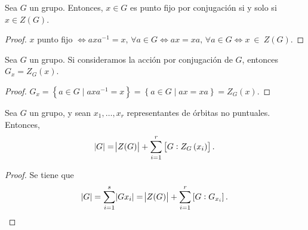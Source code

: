 \begin{prop}
    Sea $G$ un grupo. Entonces, $x \in G$ es punto fijo por conjugación si y solo si $x \in Z(G)$.
\end{prop}
\begin{proof}
    $x$ punto fijo $\iff axa^{-1} = x,\,\forall a \in G \iff ax = xa,\, \forall a \in G \iff x~\in~Z(G)$.
\end{proof}

\begin{prop}
    Sea $G$ un grupo. Si consideramos la acción por conjugación de $G$, entonces $G_x = Z_G(x)$.
\end{prop}
\begin{proof}
    $G_x = \left\{ a \in G \mid axa^{-1} = x \right\} = \left\{ a \in G \mid ax = xa \right\} = Z_G(x)$.
\end{proof}

\begin{prop}\label{prop_form_orbitas}
    Sea $G$ un grupo, y sean $x_1, \dots, x_r$ representantes de órbitas no puntuales. Entonces,
    \[
        \abs{G} = \abs{Z(G)} + \sum^r_{i=1} \left[ G : Z_G\left( x_i \right) \right].
    \]
\end{prop}
\begin{proof}
    Se tiene que
    \[
        \abs{G} = \sum^s_{i=1} \abs{Gx_i} = \abs{Z(G)} + \sum^r_{i=1} \left[ G : G_{x_i} \right].
    \]
\end{proof}

